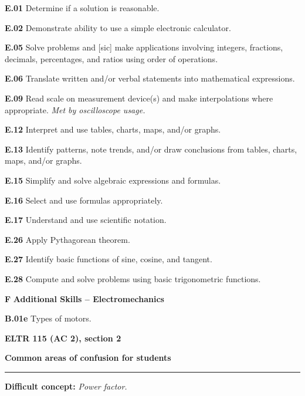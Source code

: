 \item{\bf E.01} Determine if a solution is reasonable.
\item{\bf E.02} Demonstrate ability to use a simple electronic calculator.
\item{\bf E.05} Solve problems and [sic] make applications involving integers, fractions, decimals, percentages, and ratios using order of operations.
\item{\bf E.06} Translate written and/or verbal statements into mathematical expressions.
\item{\bf E.09} Read scale on measurement device(s) and make interpolations where appropriate.  {\it Met by oscilloscope usage.}
\item{\bf E.12} Interpret and use tables, charts, maps, and/or graphs.
\item{\bf E.13} Identify patterns, note trends, and/or draw conclusions from tables, charts, maps, and/or graphs.
\item{\bf E.15} Simplify and solve algebraic expressions and formulas.
\item{\bf E.16} Select and use formulas appropriately.
\item{\bf E.17} Understand and use scientific notation.
\item{\bf E.26} Apply Pythagorean theorem.
\item{\bf E.27} Identify basic functions of sine, cosine, and tangent.
\item{\bf E.28} Compute and solve problems using basic trigonometric functions.
\medskip

\vskip 5pt

\medskip
\item{\bf F} {\bf Additional Skills -- Electromechanics}
\item{\bf B.01e} Types of motors.
\medskip







\vfil \eject

\centerline{\bf ELTR 115 (AC 2), section 2} \bigskip 
 
\vskip 10pt

\noindent
{\bf Common areas of confusion for students}

\vskip 5pt

\hrule \vskip 5pt

\vskip 10pt

\noindent
{\bf Difficult concept: } {\it Power factor.}

